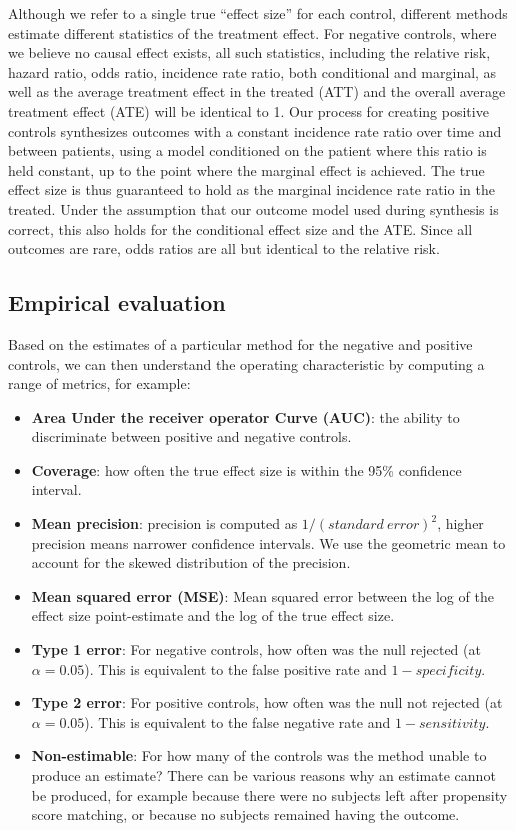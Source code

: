 \documentclass[11pt]{book}
\providecommand{\tightlist}{%
  \setlength{\itemsep}{0pt}\setlength{\parskip}{0pt}}
\theoremstyle{definition}
\theoremstyle{definition}
\theoremstyle{definition}
\theoremstyle{remark}
\begin{document}
Although we refer to a single true ``effect size'' for each control, different methods estimate different statistics of the treatment effect. For negative controls, where we believe no causal effect exists, all such statistics, including the relative risk, hazard ratio, odds ratio, incidence rate ratio, both conditional and marginal, as well as the average treatment effect in the treated (ATT) and the overall average treatment effect (ATE) will be identical to 1. Our process for creating positive controls synthesizes outcomes with a constant incidence rate ratio over time and between patients, using a model conditioned on the patient where this ratio is held constant, up to the point where the marginal effect is achieved. The true effect size is thus guaranteed to hold as the marginal incidence rate ratio in the treated. Under the assumption that our outcome model used during synthesis is correct, this also holds for the conditional effect size and the ATE. Since all outcomes are rare, odds ratios are all but identical to the relative risk.

\hypertarget{metrics}{%
\subsection{Empirical evaluation}\label{metrics}}

Based on the estimates of a particular method for the negative and positive controls, we can then understand the operating characteristic by computing a range of metrics, for example:

\begin{itemize}
\tightlist
\item
  \textbf{Area Under the receiver operator Curve (AUC)}: the ability to discriminate between positive and negative controls.
\item
  \textbf{Coverage}: how often the true effect size is within the 95\% confidence interval.
\item
  \textbf{Mean precision}: precision is computed as \(1/(standard\ error)^2\), higher precision means narrower confidence intervals. We use the geometric mean to account for the skewed distribution of the precision.
\item
  \textbf{Mean squared error (MSE)}: Mean squared error between the log of the effect size point-estimate and the log of the true effect size.
\item
  \textbf{Type 1 error}: For negative controls, how often was the null rejected (at \(\alpha = 0.05\)). This is equivalent to the false positive rate and \(1 - specificity\).
\item
  \textbf{Type 2 error}: For positive controls, how often was the null not rejected (at \(\alpha = 0.05\)). This is equivalent to the false negative rate and \(1 - sensitivity\).
\item
  \textbf{Non-estimable}: For how many of the controls was the method unable to produce an estimate? There can be various reasons why an estimate cannot be produced, for example because there were no subjects left after propensity score matching, or because no subjects remained having the outcome.
\end{itemize}
\end{document}
